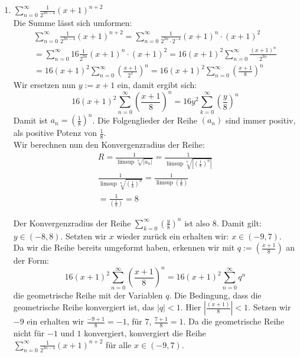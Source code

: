 \documentclass{article}
\begin{document}
    \begin{enumerate}[ label= (\alph*) ]
        \item {\large \( \sum_{n=0}^{\infty} \frac{1}{2^{3n-4}} {(x+1)}^{n+2} \) } \\
        Die Summe lässt sich umformen:
        \begin{gather*}
            \sum_{n=0}^{\infty} \frac{1}{2^{3n-4}} {(x+1)}^{n+2} = \sum_{n=0}^{\infty} \frac{1}{2^{3n} \cdot 2^{-4}} {(x+1)}^{n} \cdot {(x+1)}^{2} \\
            = \sum_{n=0}^{\infty} 16 \frac{1}{2^{3n}} {(x+1)}^{n} \cdot {(x+1)}^{2} = 16 {(x+1)}^{2} \sum_{n=0}^{\infty} \frac{ {(x+1)}^{n} }{2^{3n}} \\
            = 16 {(x+1)}^{2} \sum_{n=0}^{\infty} {\left( \frac{ {x+1} }{2^3} \right)}^n = 16 {(x+1)}^{2} \sum_{n=0}^{\infty} {\left( \frac{ {x+1} }{8} \right)}^n
        \end{gather*}
        Wir ersetzen nun \( y:= x + 1 \) ein, damit ergibt sich:
        \[ 16 {(x+1)}^{2} \sum_{n=0}^{\infty} {\left( \frac{ {x+1} }{8} \right)}^n = 16y^2 \sum_{k=0}^{\infty} { \left( \frac{y}{8} \right) }^n \]
        Damit ist \( a_n = { \left( \frac{1}{8} \right) }^n \). Die Folgenglieder der Reihe \((a_n)\) sind immer positiv, als positive Potenz von \(\frac{1}{8}\). \\
        Wir berechnen nun den Konvergenzradius der Reihe:
        \begin{gather*}
            R = \frac{1}{ \limsup \sqrt[n]{|a_n|} } = \frac{1}{ \limsup \sqrt[n]{ \left| { \left( \frac{1}{8} \right) }^n \right| } } \\
            \frac{1}{ \limsup \sqrt[n]{ { \left( \frac{1}{8} \right) }^n } } = \frac{1}{ \limsup \left( \frac{1}{8} \right) } \\
            = \frac{1}{ \left( \frac{1}{8} \right) } = 8
        \end{gather*}

        Der Konvergenzradius der Reihe \(\sum_{k=0}^{\infty} { \left( \frac{y}{8} \right) }^n\) ist also 8. Damit gilt: \(y \in (-8, 8) \).
        Setzten wir \(x\) wieder zurück ein erhalten wir: \(x \in (-9, 7) \). \\

        Da wir die Reihe bereits umgeformt haben, erkennen wir mit \(q:= \left( \frac { x+1 }{8} \right) \) an der Form:
        \[ 16 {(x+1)}^{2} \sum_{n=0}^{\infty} {\left( \frac {x+1}{8} \right)}^n = 16 {(x+1)}^{2} \sum_{n=0}^{\infty} {q}^n \]
        die geometrische Reihe mit der Variablen \(q\). Die Bedingung, dass die geometrische Reihe konvergiert ist,
        das \( |q| < 1 \). Hier \( |\frac{(x+1)}{8}| < 1 \).
        Setzen wir \(-9\) ein erhalten wir \(\frac{-9 + 1}{8} = -1\), für \(7\), \(\frac{7 + 1}{8} = 1\). 
        Da die geometrische Reihe nicht für \(-1\) und \(1\) konvergiert, konvergiert die Reihe \(\sum_{n=0}^{\infty} \frac{1}{2^{3n-4}} {(x+1)}^{n+2}\)
        für alle \(x \in (-9, 7)\).


\end{enumerate}
\end{document}
